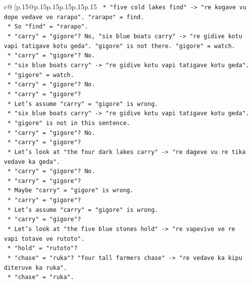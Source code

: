 \documentclass{article}
\begin{document}
{\begin{supertabular}{c@{$\;$}|p{.15\linewidth}@{}p{.15\linewidth}p{.15\linewidth}p{.15\linewidth}p{.15\linewidth}p{.15\linewidth}}
{{{\texttt{            *   "five cold lakes find" {-}> "re kogave vu dope vedave ve rarapo". "rarapo" = find.} \\
\texttt{            *   So "find" = "rarapo".} \\
\texttt{            *   "carry" = "gigore"? No, "six blue boats carry" {-}> "re gidive kotu vapi tatigave kotu geda". "gigore" is not there. "gigore" = watch.} \\
\texttt{            *   "carry" = "gigore"? No.} \\
\texttt{            *   "six blue boats carry" {-}> "re gidive kotu vapi tatigave kotu geda".} \\
\texttt{            *   "gigore" = watch.} \\
\texttt{            *   "carry" = "gigore"? No.} \\
\texttt{            *   "carry" = "gigore"?} \\
\texttt{            *   Let's assume "carry" = "gigore" is wrong.} \\
\texttt{            *   "six blue boats carry" {-}> "re gidive kotu vapi tatigave kotu geda".} \\
\texttt{            *   "gigore" is not in this sentence.} \\
\texttt{            *   "carry" = "gigore"? No.} \\
\texttt{            *   "carry" = "gigore"?} \\
\texttt{            *   Let's look at "the four dark lakes carry" {-}> "re dageve vu re tika vedave ka geda".} \\
\texttt{            *   "carry" = "gigore"? No.} \\
\texttt{            *   "carry" = "gigore"?} \\
\texttt{            *   Maybe "carry" = "gigore" is wrong.} \\
\texttt{            *   "carry" = "gigore"?} \\
\texttt{            *   Let's assume "carry" = "gigore" is wrong.} \\
\texttt{            *   "carry" = "gigore"?} \\
\texttt{            *   Let's look at "the five blue stones hold" {-}> "re vapevive ve re vapi totave ve rutoto".} \\
\texttt{            *   "hold" = "rutoto"?} \\
\texttt{            *   "chase" = "ruka"? "four tall farmers chase" {-}> "re vedave ka kipu diteruve ka ruka".} \\
\texttt{            *   "chase" = "ruka".} \\
}}}
\end{supertabular}}
\end{document}
